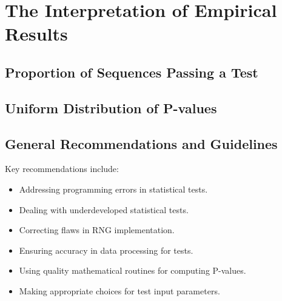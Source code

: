 \documentclass[12pt,openany]{book}
\theoremstyle{definition}
\begin{document}
	\section{The Interpretation of Empirical Results}
	\subsection{Proportion of Sequences Passing a Test}
%

	\subsection{Uniform Distribution of P-values}
	
	\subsection{General Recommendations and Guidelines}
	Key recommendations include:
	\begin{itemize}
		\item Addressing programming errors in statistical tests.
		\item Dealing with underdeveloped statistical tests.
		\item Correcting flaws in RNG implementation.
		\item Ensuring accuracy in data processing for tests.
		\item Using quality mathematical routines for computing P-values.
		\item Making appropriate choices for test input parameters.
	\end{itemize}
	
\end{document}
